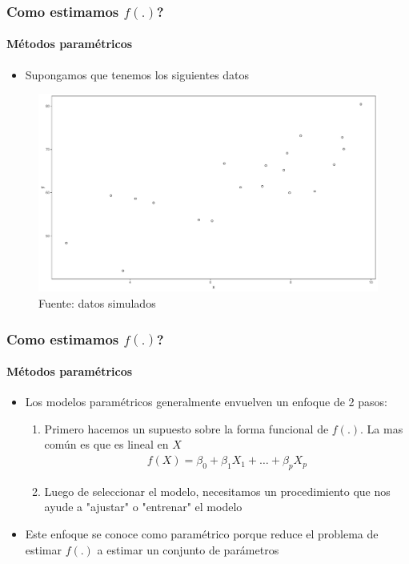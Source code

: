 \documentclass[
  shownotes,
  xcolor={svgnames},
  hyperref={colorlinks,citecolor=DarkBlue,linkcolor=DarkRed,urlcolor=DarkBlue}
  , aspectratio=169]{beamer}
\begin{document}

\begin{frame}
\frametitle{Como estimamos $f(.)$?}
\framesubtitle{Métodos paramétricos}


\begin{itemize}
 \item Supongamos que tenemos los siguientes datos 
\end{itemize}

\begin{figure}[H] \centering
  \centering
  \includegraphics[scale=0.25]{figures/fig_1.pdf}
  \\
  \tiny
  Fuente: datos simulados
\end{figure}

\end{frame}


\begin{frame}
\frametitle{Como estimamos $f(.)$?}
\framesubtitle{Métodos paramétricos}

\begin{itemize}
  \item Los modelos paramétricos generalmente envuelven un enfoque de 2 pasos:
  \medskip

  \begin{enumerate}
    \item Primero hacemos un supuesto sobre la forma funcional de $f(.)$. La mas común es que es lineal en $X$
    \begin{align}
    f(X) = \beta_0 + \beta_1 X_1 + \dots + \beta_p X_p 
    \end{align}

    \item Luego de seleccionar el modelo, necesitamos un procedimiento que nos ayude a "ajustar" o "entrenar" el modelo
  \end{enumerate}
  \medskip

  \item Este enfoque se conoce como paramétrico porque reduce el problema de estimar $f(.)$ a estimar un conjunto de parámetros
\end{itemize}

\end{frame}
\end{document}

